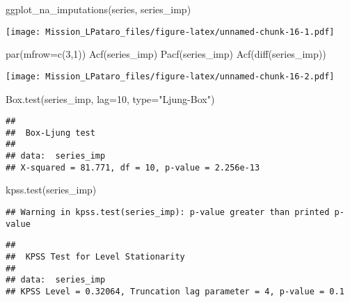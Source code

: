 \documentclass[
]{article}
\newenvironment{Shaded}{\begin{snugshade}}{\end{snugshade}}
\newcommand{\AttributeTok}[1]{\textcolor[rgb]{0.77,0.63,0.00}{#1}}
\newcommand{\DecValTok}[1]{\textcolor[rgb]{0.00,0.00,0.81}{#1}}
\newcommand{\FunctionTok}[1]{\textcolor[rgb]{0.00,0.00,0.00}{#1}}
\newcommand{\NormalTok}[1]{#1}
\newcommand{\StringTok}[1]{\textcolor[rgb]{0.31,0.60,0.02}{#1}}
\begin{document}
\begin{Shaded}
\begin{Highlighting}[]
\FunctionTok{ggplot\_na\_imputations}\NormalTok{(series, series\_imp)}
\end{Highlighting}
\end{Shaded}

\texttt{[image: Mission\_LPataro\_files/figure-latex/unnamed-chunk-16-1.pdf]}

\begin{Shaded}
\begin{Highlighting}[]
\FunctionTok{par}\NormalTok{(}\AttributeTok{mfrow=}\FunctionTok{c}\NormalTok{(}\DecValTok{3}\NormalTok{,}\DecValTok{1}\NormalTok{))}
\FunctionTok{Acf}\NormalTok{(series\_imp)}
\FunctionTok{Pacf}\NormalTok{(series\_imp)}
\FunctionTok{Acf}\NormalTok{(}\FunctionTok{diff}\NormalTok{(series\_imp))}
\end{Highlighting}
\end{Shaded}

\texttt{[image: Mission\_LPataro\_files/figure-latex/unnamed-chunk-16-2.pdf]}

\begin{Shaded}
\begin{Highlighting}[]
\FunctionTok{Box.test}\NormalTok{(series\_imp, }\AttributeTok{lag=}\DecValTok{10}\NormalTok{, }\AttributeTok{type=}\StringTok{"Ljung{-}Box"}\NormalTok{)}
\end{Highlighting}
\end{Shaded}

\begin{verbatim}
## 
##  Box-Ljung test
## 
## data:  series_imp
## X-squared = 81.771, df = 10, p-value = 2.256e-13
\end{verbatim}

\begin{Shaded}
\begin{Highlighting}[]
\FunctionTok{kpss.test}\NormalTok{(series\_imp)}
\end{Highlighting}
\end{Shaded}

\begin{verbatim}
## Warning in kpss.test(series_imp): p-value greater than printed p-value
\end{verbatim}

\begin{verbatim}
## 
##  KPSS Test for Level Stationarity
## 
## data:  series_imp
## KPSS Level = 0.32064, Truncation lag parameter = 4, p-value = 0.1
\end{verbatim}
\end{document}
